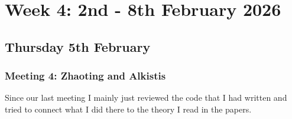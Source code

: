 \section{Week 4: 2nd - 8th February 2026}

\subsection{Thursday 5th February}

\subsubsection{Meeting 4: Zhaoting and Alkistis}

Since our last meeting I mainly just reviewed the code that I had written and tried to connect what I did there to the theory I read in the papers.

